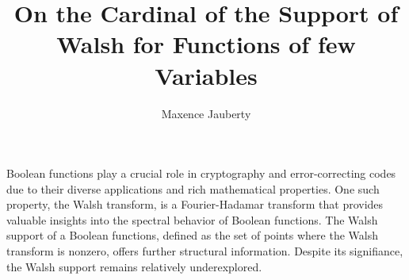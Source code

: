 \documentclass[a4paper]{article}
\title{On the Cardinal of the Support of Walsh for Functions of few Variables}
\author{Maxence Jauberty}
\begin{document}
\maketitle
Boolean functions play a crucial role in cryptography and error-correcting codes due to their
diverse applications and rich mathematical properties. One such property, the Walsh 
transform, is a Fourier-Hadamar transform that provides valuable insights into the 
spectral behavior of Boolean functions. The Walsh support of a Boolean functions, defined 
as the set of points where the Walsh transform is nonzero, offers further structural information.
Despite its signifiance, the Walsh support remains relatively underexplored.
\end{document}
